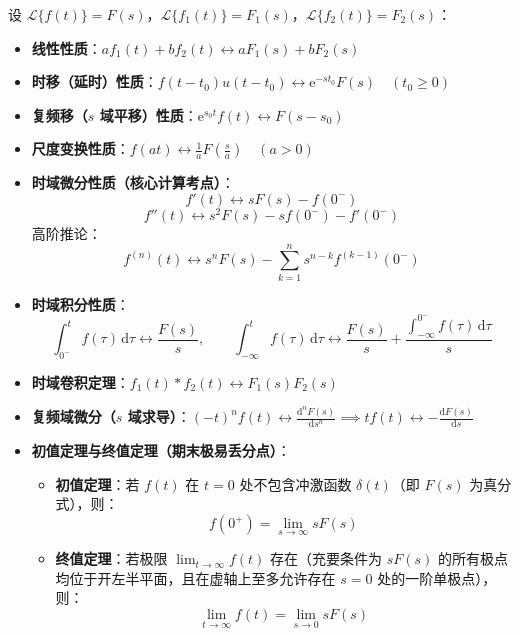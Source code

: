 \documentclass[11pt,a4paper,fontset=fandol]{ctexart}
\theoremstyle{remark}
\begin{document}
设 $\mathcal{L}\{f(t)\} = F(s)$，$\mathcal{L}\{f_1(t)\} = F_1(s)$，$\mathcal{L}\{f_2(t)\} = F_2(s)$：
\begin{itemize}
    \item \textbf{线性性质}：$a f_1(t) + b f_2(t) \longleftrightarrow a F_1(s) + b F_2(s)$
    \item \textbf{时移（延时）性质}：$f(t - t_0)u(t - t_0) \longleftrightarrow \mathrm{e}^{-s t_0}F(s) \quad (t_0 \ge 0)$
    \item \textbf{复频移（$s$ 域平移）性质}：$\mathrm{e}^{s_0 t}f(t) \longleftrightarrow F(s - s_0)$
    \item \textbf{尺度变换性质}：$f(at) \longleftrightarrow \frac{1}{a}F\left(\frac{s}{a}\right) \quad (a > 0)$
    \item \textbf{时域微分性质（核心计算考点）}：
    \begin{equation}
        f'(t) \longleftrightarrow s F(s) - f(0^-)
    \end{equation}
    \begin{equation}
        f''(t) \longleftrightarrow s^2 F(s) - s f(0^-) - f'(0^-)
    \end{equation}
    高阶推论：
    \begin{equation}
        f^{(n)}(t) \longleftrightarrow s^n F(s) - \sum_{k=1}^n s^{n-k} f^{(k-1)}(0^-)
    \end{equation}
    \item \textbf{时域积分性质}：
    \begin{equation}
        \int_{0^-}^t f(\tau)\,\mathrm{d}\tau \longleftrightarrow \frac{F(s)}{s}, \qquad \int_{-\infty}^t f(\tau)\,\mathrm{d}\tau \longleftrightarrow \frac{F(s)}{s} + \frac{\int_{-\infty}^{0^-} f(\tau)\,\mathrm{d}\tau}{s}
    \end{equation}
    \item \textbf{时域卷积定理}：$f_1(t) * f_2(t) \longleftrightarrow F_1(s) F_2(s)$
    \item \textbf{复频域微分（$s$ 域求导）}：$(-t)^n f(t) \longleftrightarrow \frac{\mathrm{d}^n F(s)}{\mathrm{d}s^n} \implies t f(t) \longleftrightarrow -\frac{\mathrm{d}F(s)}{\mathrm{d}s}$
    \item \textbf{初值定理与终值定理（期末极易丢分点）}：
    \begin{itemize}
        \item \textbf{初值定理}：若 $f(t)$ 在 $t=0$ 处不包含冲激函数 $\delta(t)$（即 $F(s)$ 为真分式），则：
        \begin{equation}
            f(0^+) = \lim_{s \to \infty} s F(s)
        \end{equation}
        \item \textbf{终值定理}：若极限 $\lim_{t \to \infty} f(t)$ 存在（充要条件为 $s F(s)$ 的所有极点均位于开左半平面，且在虚轴上至多允许存在 $s = 0$ 处的一阶单极点），则：
        \begin{equation}
            \lim_{t \to \infty} f(t) = \lim_{s \to 0} s F(s)
        \end{equation}
    \end{itemize}
\end{itemize}
\end{document}
